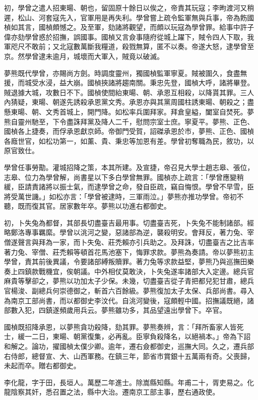 \begin{pinyinscope}
初，學曾之遣人招東暘、朝也，留固原十餘日以俟之，帝責其玩寇；李昫渡河又稍遲，松山、河套寇先入，官軍用是再失利。學曾嘗上疏令監軍無與兵事，帝為飭國楨如其言，國楨頗憾之。及至軍，劾諸將觀望，而頗以玩寇為學曾罪。給事中許子偉亦劾學曾惑於招撫，誤國事。國楨又言僉事隨府從城上躍下，賊令四人下取，我軍咫尺不敢前；又北寇數萬斷我糧道，殺戮無算，匿不以奏。帝遂大怒，逮學曾至京。然學曾逮未逾月，城壞而大軍入，賊竟以破滅。

夢熊既代學曾，亦賜尚方劍。時調度靈州，獨國楨監軍寧夏。賊被圍久，食盡無援，而城受水浸，益大崩。國楨挾諸將趨南關。秉忠先登，國楨大呼，諸將畢登。賊退據大城，攻數日不下。國楨使間紿東暘、朝、承恩互相殺，以降貰其罪。三人內猜疑，東暘、朝遂先誘殺承恩黨文秀。承恩亦與其黨周國柱誘東暘、朝殺之；盡懸東暘、朝、文秀首城上，開門降。如松率兵圍拜家。拜倉皇縊，闔室自焚死。夢熊自靈州馳至，下令盡誅拜黨及降人二千，慰問宗室士庶。寧夏平。夢熊、正色、國楨各上捷奏，而俘承恩獻京師。帝御門受賀，詔磔承恩於市，夢熊、正色、國楨各廕世官，如松功第一，如薰、貴、秉忠等加恩有差。學曾初奪職為民，敘功，以原官致仕。

學曾任事勞勩。灌城招降之策，本其所建。及宣捷，帝召見大學士趙志皋、張位，志皋、位力為學曾解，尚書星以下多白學曾無罪。國楨亦上疏言：「學曾應變稍緩，臣請責諸將以振士氣，而逮學曾之命，發自臣疏，竊自悔恨。學曾不早雪，臣將受萬世譏。」如松亦言：「學曾被逮時，三軍雨泣。」夢熊亦推功學曾。帝初不聽，既而復其官。居家數年卒。夢熊以功進右都御史。

初，卜失兔為都督，其部長切盡臺吉最用事。切盡臺吉死，卜失兔不能制諸部。經略鄭洛專事羈縻。學曾以洮河之變，惡諸部為逆，襲殺明安。會拜反，著力兔、宰僧遂聲言與拜為一家，而卜失兔、莊禿賴亦引兵助之。及拜誅，切盡臺吉之比吉率著力兔、宰僧、莊禿賴等頓首花馬池塞下，悔罪求款。夢熊為奏請。帝以夢熊初主學曾，責其前後異議，令要諸部縛叛贖罪。著力兔等求款益堅，夢熊乃與巡撫田樂奏上四鎮款戰機宜，俟朝議。中外相仗莫敢決，卜失兔遂率諸部大入定邊。總兵官麻貴等擊卻之，夢熊以功加太子少保。未幾，切盡臺吉從子青把都兒犯甘肅，總兵官楊浚、副總兵何崇德御之，斬首六百餘級。夢熊復加太子太保、兵部尚書。尋入為南京工部尚書，而以都御史李汶代。自洮河變後，寇頗輕中國。招撫議既絕，諸部數入犯，四鎮遂頻歲用兵云。夢熊雖功多，其品望遠出學曾下。卒官。

國楨既招降承恩，以夢熊貪功殺降，劾其罪。夢熊奏辨，言：「拜所畜家人皆死士，緩一二日，東暘、朝黨復集，必再亂。臣寧負殺降名，以絕禍本。」帝為下詔和解之。論功，擢國楨太僕少卿。逾年，遷右僉都御史，巡撫大同。久之，遷兵部右侍郎，總督宣、大、山西軍務。在鎮三年，節省市賞銀十五萬兩有奇。父喪歸，未起而卒。贈右都御史。

李化龍，字于田，長垣人。萬歷二年進士。除嵩縣知縣。年甫二十，胥吏易之。化龍陰察其奸，悉召置之法，縣中大治。遷南京工部主事，歷右通政使。


\end{pinyinscope}
